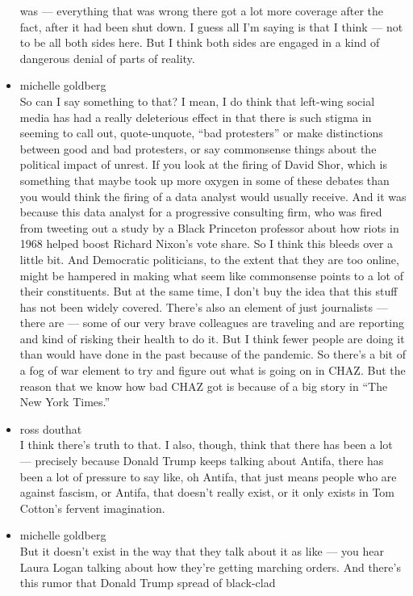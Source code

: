 \begin{itemize}
  was --- everything that was wrong there got a lot more coverage after
  the fact, after it had been shut down. I guess all I'm saying is that
  I think --- not to be all both sides here. But I think both sides are
  engaged in a kind of dangerous denial of parts of reality.
\item
  michelle goldberg\\
  So can I say something to that? I mean, I do think that left-wing
  social media has had a really deleterious effect in that there is such
  stigma in seeming to call out, quote-unquote, ``bad protesters'' or
  make distinctions between good and bad protesters, or say commonsense
  things about the political impact of unrest. If you look at the firing
  of David Shor, which is something that maybe took up more oxygen in
  some of these debates than you would think the firing of a data
  analyst would usually receive. And it was because this data analyst
  for a progressive consulting firm, who was fired from tweeting out a
  study by a Black Princeton professor about how riots in 1968 helped
  boost Richard Nixon's vote share. So I think this bleeds over a little
  bit. And Democratic politicians, to the extent that they are too
  online, might be hampered in making what seem like commonsense points
  to a lot of their constituents. But at the same time, I don't buy the
  idea that this stuff has not been widely covered. There's also an
  element of just journalists --- there are --- some of our very brave
  colleagues are traveling and are reporting and kind of risking their
  health to do it. But I think fewer people are doing it than would have
  done in the past because of the pandemic. So there's a bit of a fog of
  war element to try and figure out what is going on in CHAZ. But the
  reason that we know how bad CHAZ got is because of a big story in
  ``The New York Times.''
\item
  ross douthat\\
  I think there's truth to that. I also, though, think that there has
  been a lot --- precisely because Donald Trump keeps talking about
  Antifa, there has been a lot of pressure to say like, oh Antifa, that
  just means people who are against fascism, or Antifa, that doesn't
  really exist, or it only exists in Tom Cotton's fervent imagination.
\item
  michelle goldberg\\
  But it doesn't exist in the way that they talk about it as like ---
  you hear Laura Logan talking about how they're getting marching
  orders. And there's this rumor that Donald Trump spread of black-clad

\end{itemize}
